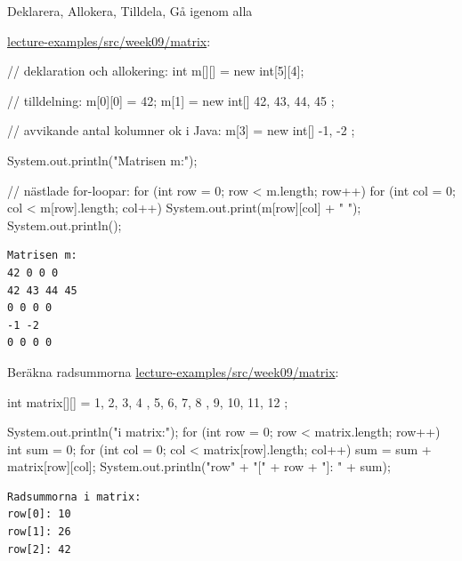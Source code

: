 \documentclass{lecturenotes}
\begin{document}
\begin{Slide}{Deklarera, Allokera, Tilldela, Gå igenom alla}
  \begin{minipage}{0.7\linewidth}   
\footnotesize\href{https://github.com/bjornregnell/lth-eda016-2015/tree/master/lectures/examples/eclipse-ws/lecture-examples/src/week09}{lecture-examples/src/week09/matrix}:

\begin{Code}[basicstyle=\ttfamily\fontsize{7}{8}\selectfont, numberstyle=,numbers=left]
// deklaration och allokering:
int m[][] = new int[5][4];
        
// tilldelning:
m[0][0] = 42;
m[1] = new int[] { 42, 43, 44, 45 };

// avvikande antal kolumner ok i Java:
m[3] = new int[] { -1, -2 }; 
        
System.out.println("Matrisen m:");

// nästlade for-loopar:        
for (int row = 0; row < m.length; row++) {
    for (int col = 0; col < m[row].length; col++) {
        System.out.print(m[row][col] + " ");
    }
    System.out.println();
}
\end{Code}
\end{minipage}
\hspace{0.5cm}
\begin{minipage}[t]{0.2\linewidth}   
\begin{verbatim}
Matrisen m:
42 0 0 0 
42 43 44 45 
0 0 0 0 
-1 -2 
0 0 0 0 
\end{verbatim}
  \end{minipage}
\end{Slide}

\begin{Slide}{Beräkna radsummorna}
\footnotesize\href{https://github.com/bjornregnell/lth-eda016-2015/tree/master/lectures/examples/eclipse-ws/lecture-examples/src/week09}{lecture-examples/src/week09/matrix}:
\begin{Code}[numberstyle=,numbers=left]
        int matrix[][] = { { 1, 2, 3, 4 }, { 5, 6, 7, 8 }, {9, 10, 11, 12} };
        
        System.out.println("\nRadsummorna i matrix:");
        for (int row = 0; row < matrix.length; row++) {
            int sum = 0;
            for (int col = 0; col < matrix[row].length; col++) {
                sum = sum + matrix[row][col];
            }
            System.out.println("row" + "[" + row + "]: " + sum);
        }        
\end{Code}
\begin{verbatim}
Radsummorna i matrix:
row[0]: 10
row[1]: 26
row[2]: 42
\end{verbatim}
\end{Slide}
\end{document}
